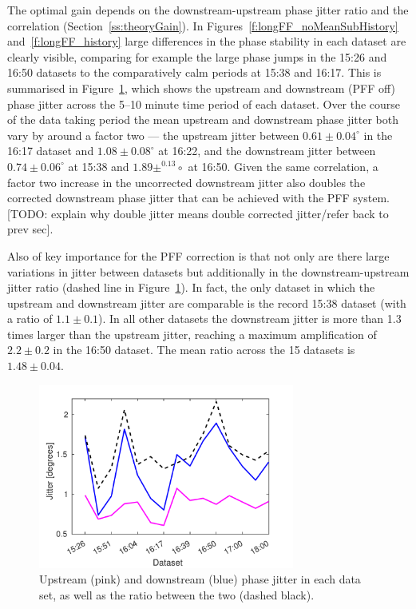 The optimal gain depends on the downstream-upstream phase jitter ratio and the correlation (Section~\ref{ss:theoryGain}). In Figures~\ref{f:longFF_noMeanSubHistory} and~\ref{f:longFF_history} large differences in the phase stability in each dataset are clearly visible, comparing for example the large phase jumps in the 15:26 and 16:50 datasets to the comparatively calm periods at 15:38 and 16:17. This is summarised in Figure~\ref{f:longFF_jitFFOff}, which shows the upstream and downstream (PFF off) phase jitter across the 5--10 minute time period of each dataset. Over the course of the data taking period the mean upstream and downstream phase jitter both vary by around a factor two --- the upstream jitter between \(0.61\pm0.04^\circ\) in the 16:17 dataset and \(1.08\pm0.08^\circ\) at 16:22, and the downstream jitter between \(0.74\pm0.06^\circ\) at 15:38 and \(1.89\pm^0.13\circ\) at 16:50. Given the same correlation, a factor two increase in the uncorrected downstream jitter also doubles the corrected downstream phase jitter that can be achieved with the PFF system. [TODO: explain why double jitter means double corrected jitter/refer back to prev sec].

Also of key importance for the PFF correction is that not only are there large variations in jitter between datasets but additionally in the downstream-upstream jitter ratio (dashed line in Figure~\ref{f:longFF_jitFFOff}). In fact, the only dataset in which the upstream and downstream jitter are comparable is the record 15:38 dataset (with a ratio of \(1.1\pm0.1\)). In all other datasets the downstream jitter is more than 1.3 times larger than the upstream jitter, reaching a maximum amplification of \(2.2\pm0.2\) in the 16:50 dataset. The mean ratio across the 15 datasets is \(1.48\pm0.04\).

\begin{figure}
  \centering
  \includegraphics[width=0.75\textwidth]{Figures/feedforward/longFF_jitDatSetFFOff}
  \caption{Upstream (pink) and downstream (blue) phase jitter in each data set, as well as the ratio between the two (dashed black).}
  \label{f:longFF_jitFFOff}
\end{figure}

